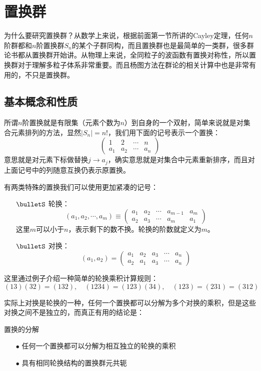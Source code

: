 \section{置换群}
为什么要研究置换群？从数学上来说，根据前面第一节所讲的Cayley定理，任何$n$阶群都和$n$阶置换群$S_n$的某个子群同构，而且置换群也是最简单的一类群，很多群论书都从置换群开始讲。从物理上来说，全同粒子的波函数有置换对称性，所以置换群对于理解多粒子体系非常重要。而且杨图方法在群论的相关计算中也是非常有用的，不只是置换群。
\subsection{基本概念和性质}
所谓$n$阶置换就是有限集（元素个数为$n$）到自身的一个双射，简单来说就是对集合元素排列的方法，显然$|S_n|=n!$，我们用下面的记号表示一个置换：
\begin{equation}
	\begin{pmatrix}
		1&2  & \cdots &n \\
		a_1& a_2 & \cdots &a_n
	\end{pmatrix}
\end{equation}
意思就是对元素下标做替换$j\to a_j$，确实意思就是对集合中元素重新排序，而且对上面记号中的列随意互换仍表示原置换。

有两类特殊的置换我们可以使用更加紧凑的记号：
\begin{itemize}
	\item[$\bulletS$]轮换：
	\begin{equation*}
		\left(a_1,a_2,\cdots,a_m\right)\equiv\begin{pmatrix}
		a_1&a_2  & \cdots &a_{m-1}&a_m \\
		a_2& a_3 & \cdots&a_m &a_1
	\end{pmatrix}
	\end{equation*} 
	这里$m$可以小于$n$，表示剩下的数不换。轮换的阶数就定义为$m$。\\
	\item[$\bulletS$]对换：
	\begin{equation}
		\left(a_1,a_2\right)=\begin{pmatrix}
			a_1&a_2  & a_3&\cdots &a_n \\
			a_2& a_1 & a_3&\cdots&a_n 
		\end{pmatrix}
	\end{equation}
\end{itemize}

这里通过例子介绍一种简单的轮换乘积计算规则：
\[(13)(32)=(132),\quad (1234)=(123)(34),\quad (123)=(231)=(312)\]

实际上对换是轮换的一种，任何一个置换都可以分解为多个对换的乘积，但是这些对换之间不是独立的，而真正有用的结论是：
\begin{theorem}{置换的分解}
	\begin{itemize}
		\item [$\bullet$] 任何一个置换都可以分解为相互独立的轮换的乘积
		\item [$\bullet$]具有相同轮换结构的置换群元共轭
	\end{itemize}
\end{theorem}

